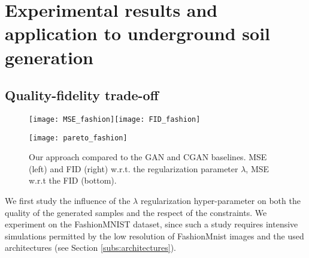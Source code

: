 \section{Experimental results and application to underground soil generation}

\subsection{Quality-fidelity trade-off}



\begin{figure}[t]
	\centering
	\texttt{[image: MSE\_fashion]}\texttt{[image: FID\_fashion]}
	
	\texttt{[image: pareto\_fashion]}
	
	\centering
	\caption{Our approach compared to the GAN and CGAN baselines. MSE (left) and  FID (right) w.r.t. the regularization parameter $\lambda$, MSE w.r.t the FID (bottom).
	}
	\label{fig:fids}
	\label{fig:mses}
	\label{fig:paretos}
\end{figure}

We first study the influence of the $\lambda$ regularization hyper-parameter on both the quality of the generated samples and the respect of the constraints. We experiment on the %
FashionMNIST \citep{Xiao2017} dataset, since such a study requires intensive simulations permitted by the low resolution of FashionMnist images and the used architectures (see Section \ref{subs:architectures}). 

